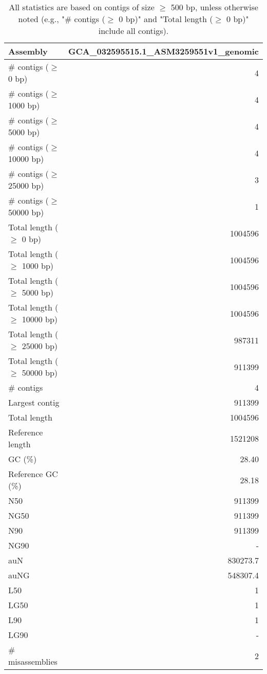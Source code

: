 \documentclass[12pt,a4paper]{article}
\begin{document}
\begin{table}[ht]
\begin{center}
\caption{All statistics are based on contigs of size $\geq$ 500 bp, unless otherwise noted (e.g., "\# contigs ($\geq$ 0 bp)" and "Total length ($\geq$ 0 bp)" include all contigs).}
\begin{tabular}{|l*{1}{|r}|}
\hline
Assembly & GCA\_032595515.1\_ASM3259551v1\_genomic \\ \hline
\# contigs ($\geq$ 0 bp) & 4 \\ \hline
\# contigs ($\geq$ 1000 bp) & 4 \\ \hline
\# contigs ($\geq$ 5000 bp) & 4 \\ \hline
\# contigs ($\geq$ 10000 bp) & 4 \\ \hline
\# contigs ($\geq$ 25000 bp) & 3 \\ \hline
\# contigs ($\geq$ 50000 bp) & 1 \\ \hline
Total length ($\geq$ 0 bp) & 1004596 \\ \hline
Total length ($\geq$ 1000 bp) & 1004596 \\ \hline
Total length ($\geq$ 5000 bp) & 1004596 \\ \hline
Total length ($\geq$ 10000 bp) & 1004596 \\ \hline
Total length ($\geq$ 25000 bp) & 987311 \\ \hline
Total length ($\geq$ 50000 bp) & 911399 \\ \hline
\# contigs & 4 \\ \hline
Largest contig & 911399 \\ \hline
Total length & 1004596 \\ \hline
Reference length & 1521208 \\ \hline
GC (\%) & 28.40 \\ \hline
Reference GC (\%) & 28.18 \\ \hline
N50 & 911399 \\ \hline
NG50 & 911399 \\ \hline
N90 & 911399 \\ \hline
NG90 & - \\ \hline
auN & 830273.7 \\ \hline
auNG & 548307.4 \\ \hline
L50 & 1 \\ \hline
LG50 & 1 \\ \hline
L90 & 1 \\ \hline
LG90 & - \\ \hline
\# misassemblies & 2 \\ \hline

\end{tabular}
\end{center}
\end{table}
\end{document}

